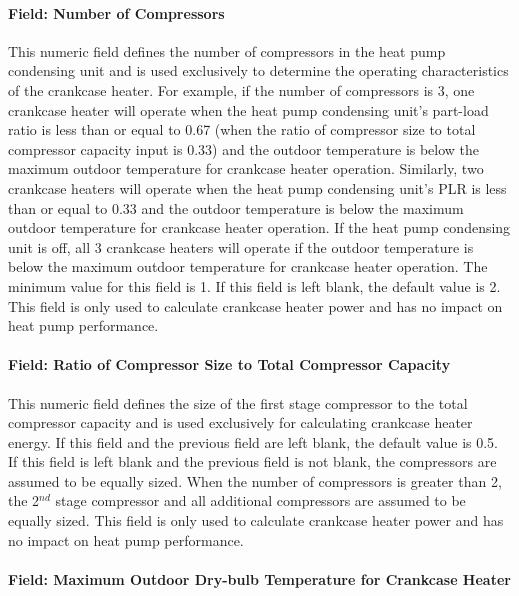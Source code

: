 \paragraph{Field: Number of Compressors}\label{field-number-of-compressors-000}

This numeric field defines the number of compressors in the heat pump condensing unit and is used exclusively to determine the operating characteristics of the crankcase heater. For example, if the number of compressors is 3, one crankcase heater will operate when the heat pump condensing unit's part-load ratio is less than or equal to 0.67 (when the ratio of compressor size to total compressor capacity input is 0.33) and the outdoor temperature is below the maximum outdoor temperature for crankcase heater operation. Similarly, two crankcase heaters will operate when the heat pump condensing unit's PLR is less than or equal to 0.33 and the outdoor temperature is below the maximum outdoor temperature for crankcase heater operation. If the heat pump condensing unit is off, all 3 crankcase heaters will operate if the outdoor temperature is below the maximum outdoor temperature for crankcase heater operation. The minimum value for this field is 1. If this field is left blank, the default value is 2. This field is only used to calculate crankcase heater power and has no impact on heat pump performance.

\paragraph{Field: Ratio of Compressor Size to Total Compressor Capacity}\label{field-ratio-of-compressor-size-to-total-compressor-capacity-000}

This numeric field defines the size of the first stage compressor to the total compressor capacity and is used exclusively for calculating crankcase heater energy. If this field and the previous field are left blank, the default value is 0.5.~ If this field is left blank and the previous field is not blank, the compressors are assumed to be equally sized. When the number of compressors is greater than 2, the 2\(^{nd}\) stage compressor and all additional compressors are assumed to be equally sized. This field is only used to calculate crankcase heater power and has no impact on heat pump performance.

\paragraph{Field: Maximum Outdoor Dry-bulb Temperature for Crankcase Heater}\label{field-maximum-outdoor-dry-bulb-temperature-for-crankcase-heater-000}

